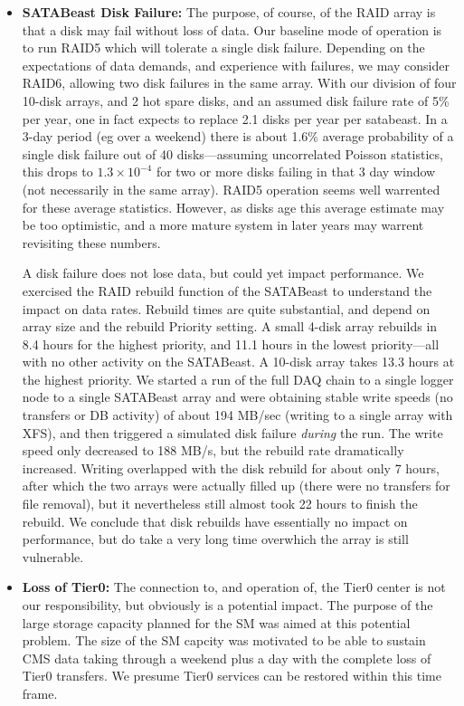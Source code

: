 \begin{itemize}
\item {\bf SATABeast Disk Failure:} The purpose, of course,
of the RAID array is that a disk may fail without loss of data.
Our baseline  mode of operation is to run RAID5 which will tolerate
a single disk failure.
Depending on the expectations of data demands, and experience with failures,
we may consider RAID6, allowing two disk failures in the same array.
With our division of four 10-disk arrays, and 2 hot spare disks,
and an assumed disk failure rate of 5\% per year, one in fact expects
to replace 2.1 disks per year per satabeast.
In a 3-day period (eg over a weekend) there is about 1.6\% average probability
of a single disk failure out of 40 disks---assuming uncorrelated Poisson statistics,
this drops to $1.3\times 10^{-4}$ for two or more disks failing in that 3 day window
(not necessarily in the same array).
RAID5 operation seems well warrented for these average statistics.
However, as disks age this average estimate may be too optimistic,
and a more mature system in later years may warrent revisiting these numbers.

A disk failure does not lose data, but could yet impact performance.
We exercised the RAID rebuild function of the SATABeast to understand the
impact on data rates.
Rebuild times are quite substantial, and depend on array size and the rebuild 
Priority setting. A small 4-disk array rebuilds in 8.4 hours for the highest
priority, and 11.1 hours in the lowest priority---all with no other activity on the SATABeast.
A 10-disk array takes 13.3 hours at the highest priority.
We started a run of the full DAQ chain to a single logger node 
to a single SATABeast array and were obtaining stable write speeds 
(no transfers or DB activity) 
of about 194 MB/sec (writing to a single array with XFS), 
and then triggered a simulated  disk failure {\it during} the run.
The write speed only decreased to 188 MB/s, but the rebuild rate dramatically increased.
Writing overlapped with the disk rebuild for about only 7 hours, after which
the  two arrays were actually filled up (there were no transfers for file removal),
but it nevertheless still almost took 22 hours to finish the rebuild.
We conclude that disk rebuilds have essentially no impact on performance,
but do take a very long time overwhich the array is still vulnerable.

\item {\bf Loss of Tier0:} The connection to, and operation of, the Tier0 center
is not our responsibility, but obviously is a potential impact.
The purpose of the large storage capacity planned for the SM was
aimed at this potential problem.
The size of the SM capcity was motivated to be able to sustain CMS data taking
through a weekend plus a day with the complete loss of Tier0 transfers.
We presume Tier0 services can be restored within this time frame.
\end{itemize}

